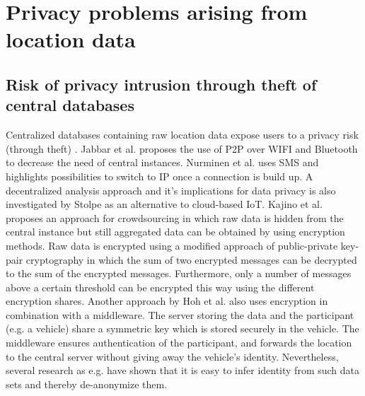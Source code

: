 \section{Privacy problems arising from location data}
\subsection{Risk of privacy intrusion through theft of central databases}
Centralized databases containing raw location data expose users to a privacy risk (through theft) \parencite{iot, hoh2006enhancing}. Jabbar et al. \parencite{p2p-android} proposes the use of P2P over WIFI and Bluetooth to decrease the need of central instances. Nurminen et al. \parencite{nurminen2006p2p} uses SMS and highlights possibilities to switch to IP once a connection is build up. A decentralized analysis approach and it's implications for data privacy is also investigated by Stolpe \parencite{iot} as an alternative to cloud-based IoT.
Kajino et al. \parencite{crowdsourcing} proposes an approach for crowdsourcing in which raw data is hidden from the central instance but still aggregated data can be obtained by using encryption methods. Raw data is encrypted using a modified approach of public-private key-pair cryptography in which the sum of two encrypted messages can be decrypted to the sum of the encrypted messages. Furthermore, only a number of messages above a certain threshold can be encrypted this way using the different encryption shares.
Another approach by Hoh et al. \parencite{hoh2006enhancing} also uses encryption in combination with a middleware. The server storing the data and the participant (e.g. a vehicle) share a symmetric key which is stored securely in the vehicle. The middleware ensures authentication of the participant, and forwards the location to the central server without giving away the vehicle's identity. Nevertheless, several research as e.g. \parencite{krumm, twitter, cellphone} have shown that it is easy to infer identity from such data sets and thereby de-anonymize them. 

